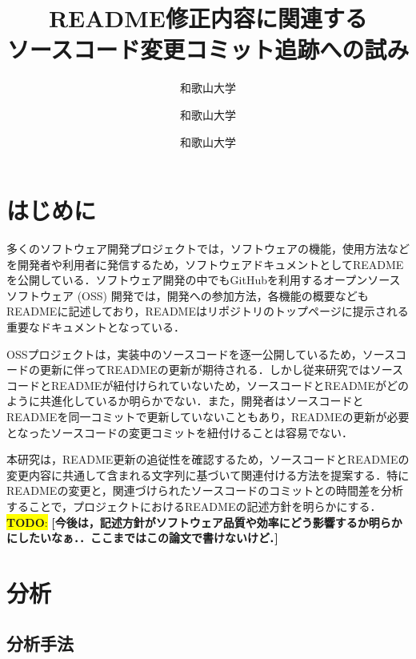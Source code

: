 \documentclass[uplatex,dvipdfmx,a4paper,twocolumn,base=11pt,jbase=11pt,ja=standard]{bxjsarticle}  %
\title{README修正内容に関連する\\ソースコード変更コミット追跡への試み}{Toward tracking source code change commits related to README revision}
\author{和歌山大学}{白﨑 優奈}{Shirasaki Yuna, Wakayama University}
\author{和歌山大学}{伊原 彰紀}{Akinori Ihara, Wakayama University}
\author{和歌山大学}{石岡 直樹}{Naoki Ishioka, Wakayama University}
\newcommand{\todo}[1]{\colorbox{yellow}{{\bf TODO}:}{\color{red} {\textbf{[#1]}}}}
\begin{document}
\maketitle


\section{はじめに}


多くのソフトウェア開発プロジェクトでは，ソフトウェアの機能，使用方法などを開発者や利用者に発信するため，ソフトウェアドキュメントとしてREADMEを公開している．ソフトウェア開発の中でもGitHubを利用するオープンソースソフトウェア (OSS) 開発では，開発への参加方法，各機能の概要などもREADMEに記述しており，READMEはリポジトリのトップページに提示される重要なドキュメントとなっている．

OSSプロジェクトは，実装中のソースコードを逐一公開しているため，ソースコードの更新に伴ってREADMEの更新が期待される．しかし従来研究ではソースコードとREADMEが紐付けられていないため，ソースコードとREADMEがどのように共進化しているか明らかでない．また，開発者はソースコードとREADMEを同一コミットで更新していないこともあり，READMEの更新が必要となったソースコードの変更コミットを紐付けることは容易でない．

本研究は，README更新の追従性を確認するため，ソースコードとREADMEの変更内容に共通して含まれる文字列に基づいて関連付ける方法を提案する．特にREADMEの変更と，関連づけられたソースコードのコミットとの時間差を分析することで，プロジェクトにおけるREADMEの記述方針を明らかにする．\todo{今後は，記述方針がソフトウェア品質や効率にどう影響するか明らかにしたいなぁ．．ここまではこの論文で書けないけど．}

\section{分析}

\subsection{分析手法}

\end{document}
